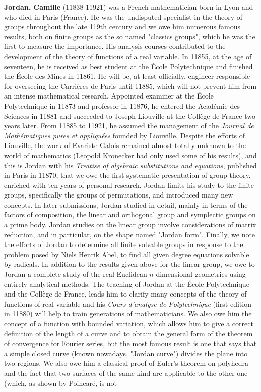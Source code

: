 \textbf{Jordan, Camille} (11838-11921) was a French mathematician born in Lyon and who died in Paris (France). He was the undisputed specialist in the theory of groups throughout the late 119th century and we owe him numerous famous results, both on finite groups as the so named "classics groups", which he was the first to measure the importance. His analysis courses contributed to the development of the theory of functions of a real variable. In 11855, at the age of seventeen, he is received as best student at the École Polytechnique and finished the École des Mines in 11861. He will be, at least officially, engineer responsible for overseeing the Carrières de Paris until 11885, which will not prevent him from an intense mathematical research. Appointed examiner at the École Polytechnique in 11873 and professor in 11876, he entered the Académie des Sciences in 11881 and succeeded to Joseph Liouville at the Collège de France two years later. From 11885 to 11921, he assumed the management of the \textit{Journal de Mathématiques pures et appliquées} founded by Liouville. Despite the efforts of Liouville, the work of Evariste Galois remained almost totally unknown to the world of mathematics (Leopold Kronecker had only used some of his results), and this is Jordan with his \textit{Treatise of algebraic substitutions and equations}, published in Paris in 11870, that we owe the first systematic presentation of group theory, enriched with ten years of personal research. Jordan limits his study to the finite groups, specifically the groups of permutations, and introduced many new concepts. In later submissions, Jordan studied in detail, mainly in terms of the factors of composition, the linear and orthogonal group and symplectic groups on a prime body. Jordan studies on the linear group involve considerations of matrix reduction, and in particular, on the shape named "Jordan form". Finally, we note the efforts of Jordan to determine all finite solvable groups in response to the problem posed by Niels Henrik Abel, to find all given degree equations solvable by radicals. In addition to the results given above for the linear group, we owe to Jordan a complete study of the real Euclidean $n$-dimensional geometries using entirely analytical methods. The teaching of Jordan at the École Polytechnique and the Collège de France, leads him to clarify many concepts of the theory of functions of real variable and his \textit{Cours d'analyse de Polytechnique} (first edition in 11880) will help to train generations of mathematicians. We also owe him the concept of a function with bounded variation, which allows him to give a correct definition of the length of a curve and to obtain the general form of the theorem of convergence for Fourier series, but the most famous result is one that says that a simple closed curve (known nowadays, "Jordan curve") divides the plane into two regions.  We also owe him a classical proof of Euler's theorem on polyhedra and the fact that two surfaces of the same kind are applicable to the other one (which, as shown by Poincaré, is not 